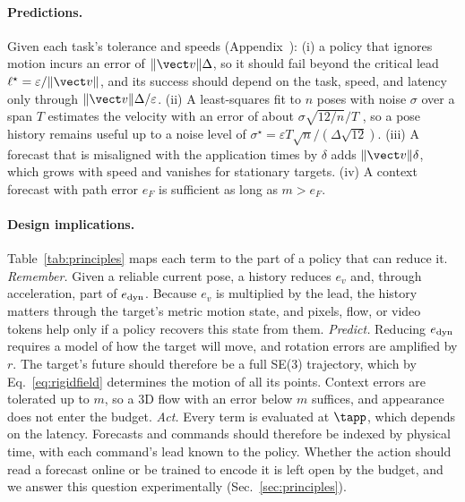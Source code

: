 \paragraph{Predictions.}
Given each task's tolerance and speeds (Appendix~): (i) a
policy that ignores motion incurs an error of $\|\vect v\|\Delta$, so it should
fail beyond the critical lead $\ell^\star=\varepsilon/\|\vect v\|$, and its success
should depend on the task, speed, and latency only through
$\|\vect v\|\Delta/\varepsilon$. (ii) A
least-squares fit to $n$ poses with noise $\sigma$ over a span $T$ estimates the
velocity with an error of about $\sigma\sqrt{12/n}/T$ \cite{barshalom2001}, so a
pose history remains useful up to a noise level of
$\sigma^\star=\varepsilon T\sqrt n/(\Delta\sqrt{12})$. (iii) A forecast that is
misaligned with the application times by $\delta$ adds $\|\vect v\|\delta$, which
grows with speed and vanishes for stationary targets. (iv) A context forecast with
path error $e_F$ is sufficient as long as $m>e_F$.



\paragraph{Design implications.}
Table~\ref{tab:principles} maps each term to the part of a policy that can reduce
it. \emph{Remember.} Given a reliable current pose, a history reduces $e_v$ and,
through acceleration, part of $e_{\rm dyn}$. Because $e_v$ is multiplied by the
lead, the history matters through the target's metric motion state, and pixels,
flow, or video tokens help only if a policy recovers this state from them.
\emph{Predict.} Reducing $e_{\rm dyn}$ requires a model of how the target will
move, and rotation errors are amplified by $r$. The target's future should
therefore be a full SE(3) trajectory, which by Eq.~\eqref{eq:rigidfield}
determines the motion of all its points. Context errors are tolerated up to $m$,
so a 3D flow with an error below $m$ suffices, and appearance does not enter the
budget. \emph{Act.} Every term is evaluated at $\tapp$, which depends on the
latency. Forecasts and commands should therefore be indexed by physical time, with
each command's lead known to the policy. Whether the action should read a forecast
online or be trained to encode it is left open by the budget, and we answer this
question experimentally (Sec.~\ref{sec:principles}).
